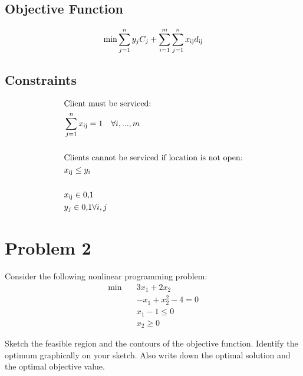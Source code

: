\documentclass[12pt]{article}
\begin{document}
\subsection{Objective Function}
    \begin{equation*}
       \min \sum_{j=1}^{n} y_jC_j + \sum_{i=1}^{m} \sum_{j=1}^{n} x\textsubscript{ij}d\textsubscript{ij}
    \end{equation*}

\subsection{Constraints}
    \begin{align*}
        &\text{Client must be serviced:}\\
        &\sum_{j=1}^{n} x\textsubscript{ij} = 1 \quad \forall i,...,m\\ \\
        &\text{Clients cannot be serviced if location is not open:}\\
        &x\textsubscript{ij} \leq y_i\\ \\
        &x\textsubscript{ij} \in \text{{0,1}}\\
        &y_j \in \text{{0,1}} \forall i,j\\
    \end{align*}

\section{Problem 2}
Consider the following nonlinear programming problem:
\begin{align}
\min \quad &3x_1 + 2x_2  \\
&-x_1 + x_2^2 -4 = 0   \\
&x_1 - 1 \leq 0  \\
&x_2 \geq 0
\end{align}

Sketch the feasible region and the contours of the objective function.
Identify the optimum graphically on your sketch. Also write down the
optimal solution and the optimal objective value.
\end{document}
